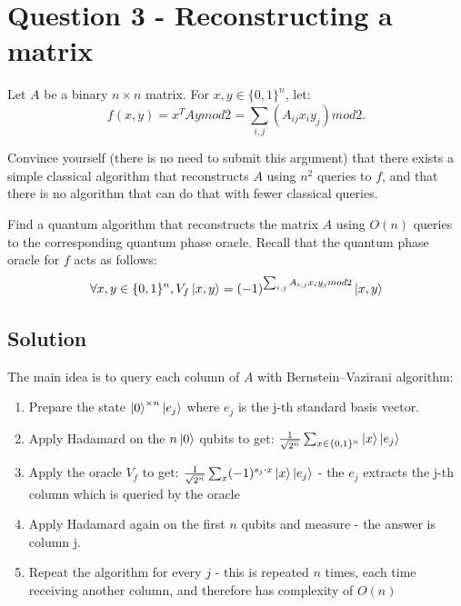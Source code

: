 \section*{Question 3 - Reconstructing a matrix}
Let $A$ be a binary $n\times n$ matrix.
For $x, y \in \{0, 1\}^n$, let:
\begin{equation*}
    f(x, y) = x^T Ay mod 2 = \sum_{i,j}(A_{ij}x_i y_j) mod 2.
\end{equation*}

Convince yourself (there is no need to submit this argument) that there exists a simple
classical algorithm that reconstructs $A$ using $n^2$ queries to $f$, and that there is no algorithm
that can do that with fewer classical queries.

Find a quantum algorithm that reconstructs the matrix $A$ using $O(n)$ queries to the
corresponding quantum phase oracle.
Recall that the quantum phase oracle for $f$ acts as follows:
\begin{equation*}
    \forall x,y \in \{0, 1\}^n, V_f \ket{x,y}= (-1)^{\sum_{i,j}A_{i,j}x_i y_j mod 2}\ket{x,y}
\end{equation*}

\subsection*{Solution}
The main idea is to query each column of $A$ with Bernstein–Vazirani algorithm:
\begin{enumerate}
    \item Prepare the state $\ket{0}^{\times n}\ket{e_j}$ where $e_j$ is the j-th standard basis vector.
    \item Apply Hadamard on the $n \ket{0}$ qubits to get: $\frac{1}{\sqrt{2^n}}\sum_{x\in\{0,1\}^n}\ket{x}\ket{e_j}$
    \item Apply the oracle $V_f$ to get: $\frac{1}{\sqrt{2^n}}\sum_x (-1)^{s_j\cdot x}\ket{x}\ket{e_j}$ - the $e_j$ extracts the j-th column which is queried by the oracle
    \item Apply Hadamard again on the first $n$ qubits and measure - the answer is column j.
    \item Repeat the algorithm for every $j$ - this is repeated $n$ times, each time receiving another column, and therefore has complexity of $O(n)$
\end{enumerate}


